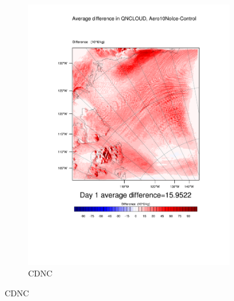 \begin{figure}[hb]
\begin{subfigure}{0.40\textwidth}
		\includegraphics[width=\textwidth]{results/aero10ni/diff_Aero10NoIce_QNCLOUD_Day1.pdf}
		\caption{CDNC}
		\label{subfig:CDNCr4Day1}
	\end{subfigure}
	

\end{figure}
